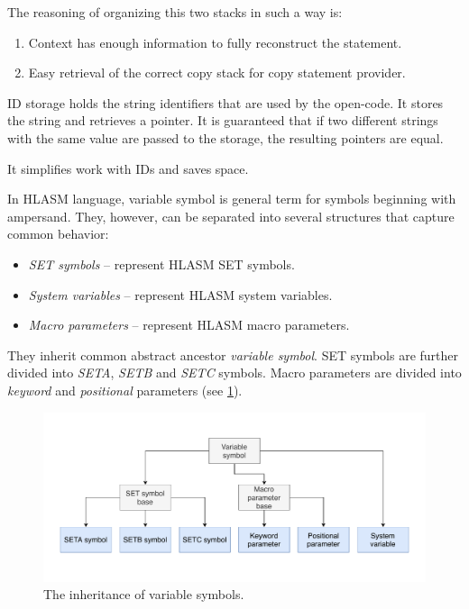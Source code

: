 The reasoning of organizing this two stacks in such a way is:
\begin{enumerate}
	\item Context has enough information to fully reconstruct the statement.
	\item Easy retrieval of the correct copy stack for copy statement provider.
\end{enumerate} 

ID storage holds the string identifiers that are used by the open-code. 
It stores the string and retrieves a pointer. It is guaranteed that if two different strings with the same value are passed to the storage, the resulting pointers are equal.

It simplifies work with IDs and saves space. 

\label{lab06:var_sym}
In HLASM language, variable symbol is general term for symbols beginning with ampersand. They, however, can be separated into several structures that capture common behavior:

\begin{itemize}
	\item \emph{SET symbols} -- represent HLASM SET symbols.
	\item \emph{System variables} -- represent HLASM system variables.
	\item \emph{Macro parameters} -- represent HLASM macro parameters.
\end{itemize}

They inherit common abstract ancestor \emph{variable symbol}. SET symbols are further divided into \emph{SETA}, \emph{SETB} and \emph{SETC} symbols. Macro parameters are divided into \emph{keyword} and \emph{positional} parameters (see \cref{fig06:var}).

\begin{figure}
	\centering
	\includegraphics[width=\textwidth]{img/variable_arch}
	\caption{The inheritance of variable symbols.}
	\label{fig06:var}
\end{figure}

